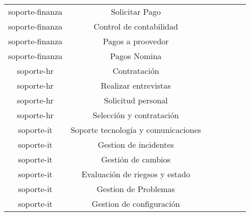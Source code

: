 \begin{table}[]
\begin{tabular}{ccccccc}
soporte-finanza&               Solicitar Pago                      &                                            &            &               &                    &         \\
soporte-finanza&               Control de contabilidad             &                                            &            &               &                    &         \\
soporte-finanza&               Pagos a proovedor                   &                                            &            &               &                    &         \\
soporte-finanza&               Pagos Nomina                        &                                            &            &               &                    &         \\
soporte-hr     &               Contratación                       &                                            &            &               &                    &         \\
soporte-hr     &               Realizar entrevistas                &                                            &            &               &                    &         \\
soporte-hr     &               Solicitud personal                  &                                            &            &               &                    &         \\
soporte-hr     &               Selección y contratación          &                                            &            &               &                    &         \\
soporte-it     &               Soporte tecnología y comunicaciones&                                            &            &               &                    &         \\
soporte-it     &               Gestion de incidentes               &                                            &            &               &                    &         \\
soporte-it     &               Gestión de cambios                 &                                            &            &               &                    &         \\
soporte-it     &               Evaluación de riegsos y estado     &                                            &            &               &                    &         \\
soporte-it     &               Gestion de Problemas                &                                            &            &               &                    &         \\
soporte-it     &               Gestion de configuración           &                                            &            &               &                    &         \\

\end{tabular}
\end{table}

